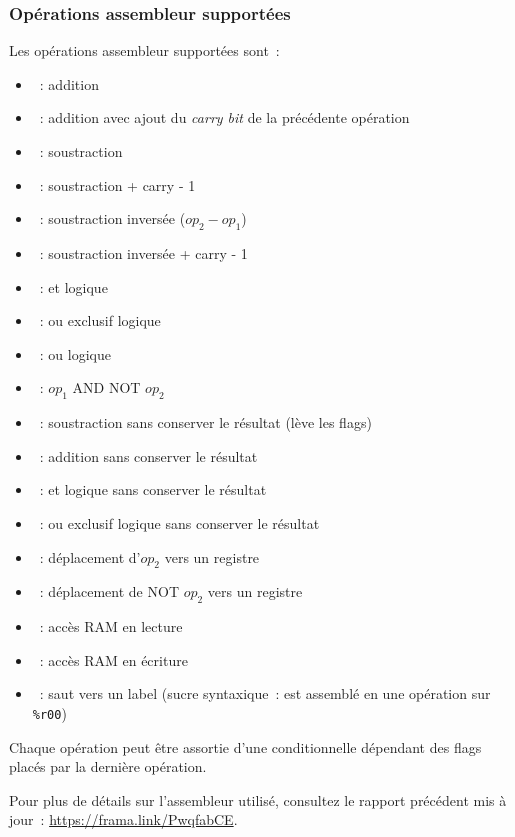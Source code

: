 \documentclass[11pt,a4paper]{article}
\begin{document}
\subsubsection{Opérations assembleur supportées}

Les opérations assembleur supportées sont~:
\begin{itemize}
\item {}~: addition
\item {}~: addition avec ajout du \textit{carry bit} de la précédente opération
\item {}~: soustraction
\item {}~: soustraction + carry - 1
\item {}~: soustraction inversée ($op_2 - op_1$)
\item {}~: soustraction inversée + carry - 1
\item {}~: et logique
\item {}~: ou exclusif logique
\item {}~: ou logique
\item {}~: $op_1$ AND NOT $op_2$
\item {}~: soustraction sans conserver le résultat (lève les flags)
\item {}~: addition sans conserver le résultat
\item {}~: et logique sans conserver le résultat
\item {}~: ou exclusif logique sans conserver le résultat
\item {}~: déplacement d'$op_2$ vers un registre
\item {}~: déplacement de NOT $op_2$ vers un registre
\item {}~: accès RAM en lecture
\item {}~: accès RAM en écriture
\item {}~: saut vers un label (sucre syntaxique~: est assemblé en une opération sur \texttt{\%r00})
\end{itemize}

Chaque opération peut être assortie d'une conditionnelle dépendant des flags placés par la dernière opération.

Pour plus de détails sur l'assembleur utilisé, consultez le rapport précédent mis à jour~: \url{https://frama.link/PwqfabCE}.

\end{document}
